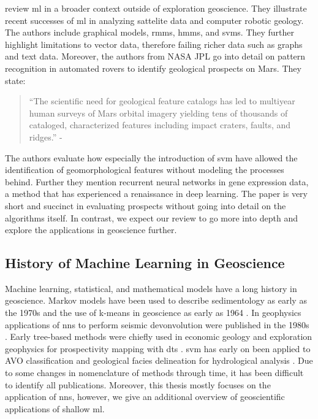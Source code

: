 \citet{Mjolsness2001-fq} review \ac{ml} in a broader context outside of exploration geoscience. They illustrate recent successes of \ac{ml} in analyzing sattelite data and computer robotic geology. The authors include graphical models, \acp{rmm}, \acp{hmm}, and \acp{svm}. They further highlight limitations to vector data, therefore failing richer data such as graphs and text data. Moreover, the authors from NASA JPL go into detail on pattern recognition in automated rovers to identify geological prospects on Mars. They state:
\begin{quote}
“The scientific need for geological feature catalogs has led to multiyear human surveys of Mars orbital imagery yielding tens of thousands of cataloged, characterized features including impact craters, faults, and ridges.” - \citep{Mjolsness2001-fq}
\end{quote}
The authors evaluate how especially the introduction of \ac{svm} have allowed the identification of geomorphological features without modeling the processes behind. Further they mention recurrent neural networks in gene expression data, a method that has experienced a renaissance in deep learning. The paper is very short and succinct in evaluating prospects without going into detail on the algorithms itself. In contrast, we expect our review to go more into depth and explore the applications in geoscience further.

\subsection{History of Machine Learning in Geoscience}
Machine learning, statistical, and mathematical models have a long history in geoscience. Markov models have been used to describe sedimentology as early as the 1970s \citep{schwarzacher1972semi} and the use of k-means in geoscience as early as 1964 \citep{preston1964fourier}. In geophysics applications of \acp{nn} to perform seismic devonvolution were published in the 1980s \citet{Zhao1988-hu}. Early tree-based methods were chiefly used in economic geology and exploration geophysics for prospectivity mapping with \acfp{dt} \citep{newendorp1976decision,reddy1991decisiontree}. \ac{svm} has early on been applied to AVO classification \cite{Li2004-fk} and geological facies delineation for hydrological analysis \citep{Tartakovsky2004-ml}. Due to some changes in nomenclature of methods through time, it has been difficult to identify all publications. Moreover, this thesis mostly focuses on the application of \acp{nn}, however, we give an additional overview of geoscientific applications of shallow \ac{ml}.

